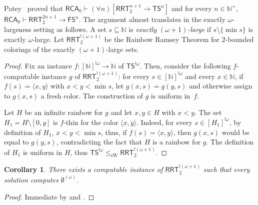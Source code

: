 \documentclass[10pt,a4paper]{article}
\newcommand{\RCA}[0]{\mathsf{RCA}}
\newcommand{\RRT}[0]{\mathsf{RRT}}
\newcommand{\FS}[0]{\mathsf{FS}}
\newcommand{\TS}[0]{\mathsf{TS}}
\newcommand{\NN}[0]{\mathbb{N}}
\newcommand{\sW}{\mathrm{sW}}
\numberwithin{theorem}{section}
\newtheorem{proposition}[theorem]{Proposition}
\newtheorem{corollary}[theorem]{Corollary}
\begin{document}

Patey~\cite{patey2015somewhere} proved that $\RCA_0 \vdash (\forall n)[\RRT^{n+1}_2 \to \TS^n]$ and for every $n \in \NN^+$, $\RCA_0 \vdash \RRT^{2n+1}_2 \to \FS^n$. The argument almost translates in the exactly $\omega$-largeness setting as follows. A set $s\subseteq\NN$ is \emph{exactly $(\omega+1)$-large} if $s \setminus \{\min s\}$ is exactly $\omega$-large. Let $\RRT^{!(\omega+1)}_2$ be the Rainbow Ramsey Theorem for $2$-bounded colorings of the exactly $(\omega+1)$-large sets.

\begin{proof}
Fix an instance $f : [\NN]^{!\omega} \to \NN$ of $\TS^{!\omega}$. Then, consider the following $f$-computable instance $g$ of $\RRT^{!(\omega + 1)}_2$: for every $s \in [\NN]^{!\omega}$ and every $x \in \NN$, if $f(s) = \langle x,y \rangle$ with $x < y < \min s$, let $g(x,s) = g(y,s)$ and otherwise assign to $g(x,s)$ a fresh color. The construction of $g$ is uniform in~$f$.

Let $H$ be an infinite rainbow for $g$ and let $x,y \in H$ with $x < y$. The set $H_1 = H \setminus [0,y]$ is $f$-thin for the color $\langle x,y \rangle$. Indeed, for every $s \in [H_1]^{!\omega}$, by definition of $H_1$, $x < y < \min s$, thus, if $f(s) = \langle x, y \rangle$, then $g(x,s)$ would be equal to $g(y,s)$, contradicting the fact that $H$ is a rainbow for $g$. The definition of $H_1$ is uniform in $H$, thus $\TS^{!\omega} \leq_{\sW} \RRT^{!(\omega+1)}_2$.
\end{proof}

\begin{corollary}
There exists a computable instance of $\RRT^{!(\omega+1)}_2$ such that every solution computes $\emptyset^{(\omega)}$.
\end{corollary}
\begin{proof}
Immediate by  and .
\end{proof}
\end{document}
